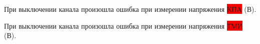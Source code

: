 			При выключении канала \colorbox{red}{} произошла ошибка при измерении напряжения \colorbox{red}{КПА}  (В).
		
		
			При выключении канала \colorbox{red}{} произошла ошибка при измерении напряжения \colorbox{red}{ТМИ}  (В).
		
		


\vspace{0.5em}
